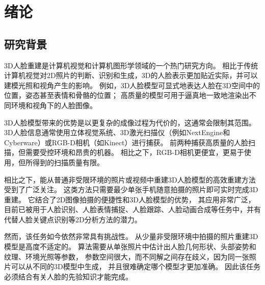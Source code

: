 \chapter{绪论}
\label{chap:intro}

\section{研究背景}

3D人脸重建是计算机视觉和计算机图形学领域的一个热门研究方向。
相比于传统计算机视觉对2D照片的判断、识别和生成，3D的人脸表示更加贴近实际，并可以建模光照和视角产生的影响。
例如，3D人脸模型可显式地表达人脸在3D空间中的位置，姿态甚至表情和骨骼的位置；
高质量的模型可用于逼真地一致地渲染出不同环境和视角下的人脸图像。

3D人脸模型带来的优势是以更复杂的成像过程为代价的，这通常会限制其范围。
3D人脸信息通常使用立体视觉系统\citep{DEP,ss_geo}、3D激光扫描仪（例如NextEngine和Cyberware）或RGB-D相机\citep{li2023}（如Kinect）进行捕获。
前两种捕获高质量的人脸扫描，但需要受控环境和昂贵的机器。
相比之下，RGB-D相机更便宜，更易于使用，但所得到的扫描质量有限。


相比之下，能从普通非受限环境的照片或视频中重建3D人脸模型的高效重建方法受到了广泛关注。
这类方法只需要最少单张手机随意拍摄的照片即可实时完成3D重建。
它结合了2D图像拍摄的便捷性和3D人脸模型的优势，
其应用非常广泛，目前已被用于人脸识别\citep{BlanzV03,1022631413.nh,zhu2015high}、人脸表情捕捉\cite{Mo2022TowardsAF}、人脸跟踪\citep{Pham2016RobustRP}、人脸动画合成\citep{Cao20133DSR,thies2016face2face}等任务中，并有代替人脸关键点识别等2D分析方法的潜力。

然而，该任务如今依然非常具有挑战性。
从少量非受限环境中拍摄的照片重建3D模型是高度不适定的。
算法需要从单张照片中估计出人脸几何形状、头部姿势和纹理、环境光照等参数，
参数空间很大，而不同解之间存在歧义，因为同一张照片可以从不同的3D模型中生成，
并且很难确定哪个模型才更加准确。
因此该任务必须结合有关人脸的先验知识才能完成。

